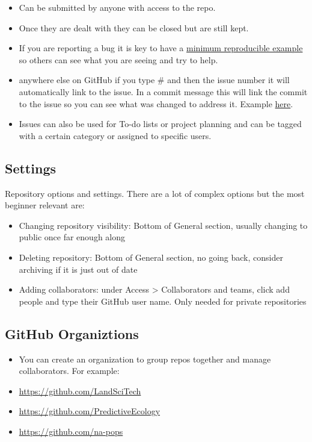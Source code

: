 \documentclass[
  letterpaper,
  DIV=11,
  numbers=noendperiod]{scrreprt}
\providecommand{\tightlist}{%
  \setlength{\itemsep}{0pt}\setlength{\parskip}{0pt}}\usepackage{longtable,booktabs,array}
\begin{document}
\begin{itemize}
\tightlist
\item
  Can be submitted by anyone with access to the repo.
\item
  Once they are dealt with they can be closed but are still kept.
\item
  If you are reporting a bug it is key to have a
  \href{https://stackoverflow.com/a/5963610/3277050}{minimum
  reproducible example} so others can see what you are seeing and try to
  help.
\item
  anywhere else on GitHub if you type \# and then the issue number it
  will automatically link to the issue. In a commit message this will
  link the commit to the issue so you can see what was changed to
  address it. Example
  \href{https://github.com/LandSciTech/caribouMetrics/issues/97}{here}.
\item
  Issues can also be used for To-do lists or project planning and can be
  tagged with a certain category or assigned to specific users.
\end{itemize}

\hypertarget{settings}{%
\subsection{Settings}\label{settings}}

Repository options and settings. There are a lot of complex options but
the most beginner relevant are:

\begin{itemize}
\tightlist
\item
  Changing repository visibility: Bottom of General section, usually
  changing to public once far enough along
\item
  Deleting repository: Bottom of General section, no going back,
  consider archiving if it is just out of date
\item
  Adding collaborators: under Access \textgreater{} Collaborators and
  teams, click add people and type their GitHub user name. Only needed
  for private repositories
\end{itemize}

\hypertarget{github-organiztions}{%
\subsection{GitHub Organiztions}\label{github-organiztions}}

\begin{itemize}
\tightlist
\item
  You can create an organization to group repos together and manage
  collaborators. For example:
\item
  \url{https://github.com/LandSciTech}
\item
  \url{https://github.com/PredictiveEcology}
\item
  \url{https://github.com/na-pops}
\end{itemize}
\end{document}
